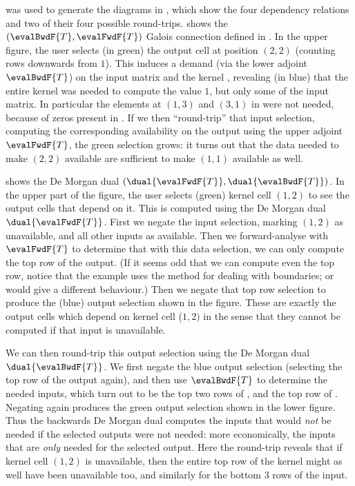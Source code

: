 

\OurLanguage{} was used to generate the diagrams in , which show the four dependency relations and two of their four possible round-trips.  shows the $(\evalBwdF{T}, \evalFwdF{T})$ Galois connection defined in . In the upper figure, the user selects (in green) the output cell at position $(2,2)$ (counting rows downwards from $1$). This induces a demand (via the lower adjoint $\evalBwdF{T}$) on the input matrix  and the kernel , revealing (in blue) that the entire kernel was needed to compute the value $1$, but only some of the input matrix. In particular the elements at $(1,3)$ and $(3,1)$ in  were not needed, because of zeros present in . If we then ``round-trip'' that input selection, computing the corresponding availability on the output using the upper adjoint $\evalFwdF{T}$, the green selection grows: it turns out that the data needed to make $(2,2)$ available are sufficient to make $(1,1)$ available as well.

 shows the De Morgan dual $(\dual{\evalFwdF{T}}, \dual{\evalBwdF{T}})$. In the upper part of the figure, the user selects (green) kernel cell $(1, 2)$ to see the output cells that depend on it. This is computed using the De Morgan dual $\dual{\evalFwdF{T}}$. First we negate the input selection, marking $(1, 2)$ as unavailable, and all other inputs as available. Then we forward-analyse with $\evalFwdF{T}$ to determine that with this data selection, we can only compute the top row of the output. (If it seems odd that we can compute even the top row, notice that the example uses the method  for dealing with boundaries;  or  would give a different behaviour.) Then we negate that top row selection to produce the (blue) output selection shown in the figure. These are exactly the output cells which depend on kernel cell ($1, 2)$ in the sense that they cannot be computed if that input is unavailable.

We can then round-trip this output selection using the De Morgan dual $\dual{\evalBwdF{T}}$. We first negate the blue output selection (selecting the top row of the output again), and then use $\evalBwdF{T}$ to determine the needed inputs, which turn out to be the top two rows of , and the top row of . Negating again produces the green output selection shown in the lower figure. Thus the backwards De Morgan dual computes the inputs that would \emph{not} be needed if the selected outputs were not needed: more economically, the inputs that are \emph{only} needed for the selected output. Here the round-trip reveals that if kernel cell $(1, 2)$ is unavailable, then the entire top row of the kernel might as well have been unavailable too, and similarly for the bottom 3 rows of the input.

